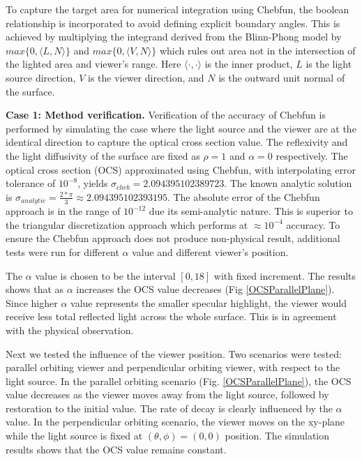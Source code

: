 \documentclass[11pt]{amsart}
\theoremstyle{definition}
\begin{document}
To capture the target area for numerical integration using Chebfun, the boolean relationship is incorporated to avoid defining explicit boundary angles. This is achieved by multiplying the integrand derived from the Blinn-Phong model by $max\{0, \langle L,N\rangle\}$ and $max\{0,\langle V,N\rangle\}$ which rules out area not in the intersection of the lighted area and viewer's range. Here $\langle\cdot, \cdot\rangle$ is the inner product, $L$ is the light source direction, $V$ is the viewer direction, and $N$ is the outward unit normal of the surface.

{\bf Case 1: Method verification.} Verification of the accuracy of Chebfun is performed by simulating the case where the light source and the viewer are at the identical direction to capture the optical cross section value. The reflexivity and the light diffusivity of the surface are fixed as $\rho = 1$ and $\alpha =0$ respectively. The optical cross section (OCS) approximated using Chebfun, with interpolating error tolerance of $10^{-8}$, yields $\sigma_{cheb} = 2.094395102389723$. The known analytic solution is $\sigma_{analytic} = \frac{2*\pi}{3}\approx 2.094395102393195$. The absolute error of the Chebfun approach is in the range of $10^{-12}$ due its semi-analytic nature. This is superior to the triangular discretization approach which performs at $\approx 10^{-4}$ accuracy. To ensure the Chebfun approach does not produce non-physical result, additional tests were run for different $\alpha$ value and different viewer's position.

The $\alpha$ value is chosen to be the interval $[0,18]$ with fixed increment. The results shows that as $\alpha$ increases the OCS value decreases (Fig \ref{OCSParallelPlane}). Since higher $\alpha$ value represents the smaller specular highlight, the viewer would receive less total reflected light across the whole surface. This is in agreement with the physical observation.

Next we tested the influence of the viewer position. Two scenarios were tested: parallel orbiting viewer and perpendicular orbiting viewer, with respect to the light source. In the parallel orbiting scenario (Fig. \ref{OCSParallelPlane}), the OCS value decreases as the viewer moves away from the light source, followed by restoration to the initial value. The rate of decay is clearly influenced by the $\alpha$ value. In the perpendicular orbiting scenario, the viewer moves on the xy-plane while the light source is fixed at $(\theta, \phi) = (0,0)$ position. The simulation results shows that the OCS value remains constant.
\end{document}
